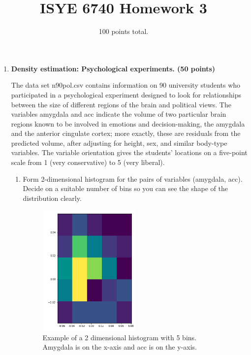 \documentclass[twoside,10pt]{article}
\begin{document}
\title{ISYE 6740 Homework 3}
\date{100 points total.}
\maketitle




\begin{enumerate}


\item {\bf Density estimation: Psychological experiments. (50 points)}

 The data set \textsf{n90pol.csv} contains information on 90 university students who participated in a psychological experiment designed to look for relationships between the size of different regions of the brain and political views. The variables \textsf{amygdala} and \textsf{acc} indicate the volume of two particular brain regions known to be involved in emotions and decision-making, the amygdala and the anterior cingulate cortex; more exactly, these are residuals from the predicted volume, after adjusting for height, sex, and similar body-type variables. The variable \textsf{orientation} gives the students' locations on a five-point scale from 1 (very conservative) to 5 (very liberal). %
 
 \begin{enumerate}
 \item Form 2-dimensional histogram for the pairs of variables (\textsf{amygdala}, \textsf{acc}). Decide on a suitable number of bins so you can see the shape of the distribution clearly. 
 
 \begin{figure}[h]
\caption{Example of a 2 dimensional histogram with 5 bins.  Amygdala is on the x-axis and acc is on the y-axis.}
\centering
\includegraphics[width=0.5\textwidth]{1_a.png}
\end{figure}
 

\end{enumerate}
\end{enumerate}
\end{document}
